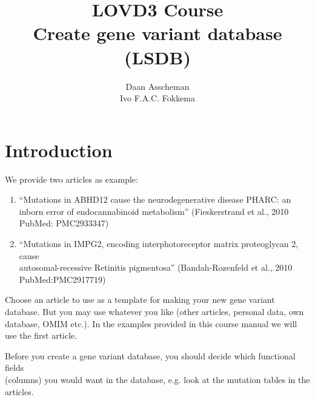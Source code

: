 

\title{LOVD3 Course \\\vskip 0.2cm Create gene variant database (LSDB)}
\author{Daan Asscheman \\ Ivo F.A.C. Fokkema}
\setpointerwidth{9pt}





\begin{titlingpage} %
\maketitle
\end{titlingpage}





\hypertarget{toc}{}
\tableofcontents









\chapter{Introduction}
We provide two articles as example:
\begin{enumerate}
	\item 
	``Mutations in ABHD12 cause the neurodegenerative disease PHARC: an inborn error of endocannabinoid
	 metabolism'' (Fieskerstrand et al., 2010 PubMed: PMC2933347)
	\item
	``Mutations in IMPG2, encoding interphotoreceptor matrix proteoglycan 2, cause \\
		autosomal-recessive Retinitis pigmentosa'' (Bandah-Rozenfeld et al., 2010 \\
		PubMed:PMC2917719)
\end{enumerate}
Choose an article to use as a template for making your new gene variant database. 
But you may use whatever you like (other articles, personal data, own database, OMIM etc.).
In the examples provided in this course manual we will use the first article.

Before you create a gene variant database, you should decide which functional fields \\
(columns) you would want in the database, e.g. look at the mutation tables in the articles.

